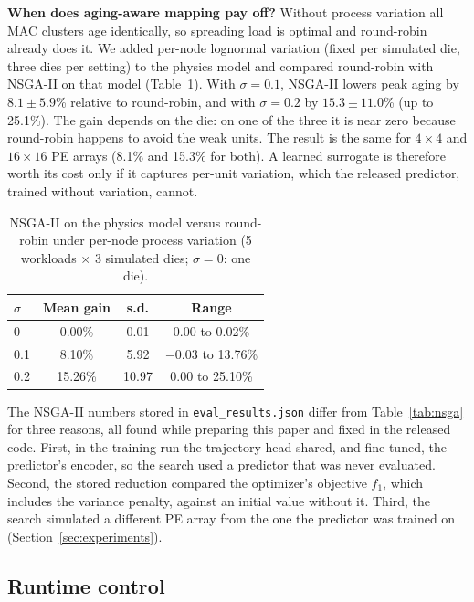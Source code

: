 \documentclass[conference]{IEEEtran}
\begin{document}
\textbf{When does aging-aware mapping pay off?} Without process variation all MAC clusters age identically, so spreading load is optimal and round-robin already does it. We added per-node lognormal variation (fixed per simulated die, three dies per setting) to the physics model and compared round-robin with NSGA-II on that model (Table~\ref{tab:variation}). With $\sigma = 0.1$, NSGA-II lowers peak aging by $8.1\pm5.9$\% relative to round-robin, and with $\sigma = 0.2$ by $15.3\pm11.0$\% (up to 25.1\%). The gain depends on the die: on one of the three it is near zero because round-robin happens to avoid the weak units. The result is the same for $4\times4$ and $16\times16$ PE arrays (8.1\% and 15.3\% for both). A learned surrogate is therefore worth its cost only if it captures per-unit variation, which the released predictor, trained without variation, cannot.

\begin{table}[t]
    \centering
    \caption{NSGA-II on the physics model versus round-robin under per-node process variation (5 workloads $\times$ 3 simulated dies; $\sigma = 0$: one die).}
    \label{tab:variation}
    \begin{tabular}{lccc}
        \toprule
        $\sigma$ & \textbf{Mean gain} & \textbf{s.d.} & \textbf{Range} \\
        \midrule
        0   & 0.00\% & 0.01 & 0.00 to 0.02\% \\
        0.1 & 8.10\% & 5.92 & $-0.03$ to 13.76\% \\
        0.2 & 15.26\% & 10.97 & 0.00 to 25.10\% \\
        \bottomrule
    \end{tabular}
\end{table}

The NSGA-II numbers stored in \texttt{eval\_results.json} differ from Table~\ref{tab:nsga} for three reasons, all found while preparing this paper and fixed in the released code. First, in the training run the trajectory head shared, and fine-tuned, the predictor's encoder, so the search used a predictor that was never evaluated. Second, the stored reduction compared the optimizer's objective $f_1$, which includes the variance penalty, against an initial value without it. Third, the search simulated a different PE array from the one the predictor was trained on (Section~\ref{sec:experiments}).

\subsection{Runtime control}
\end{document}
